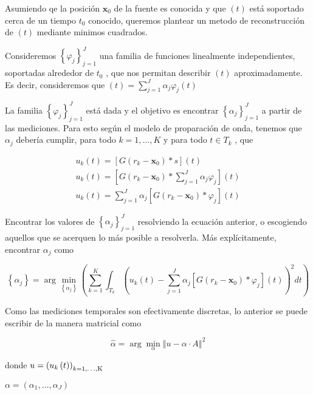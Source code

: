 Asumiendo qe la posición $\mathbf{x}_{0}$ de la fuente es conocida y que
$\left(t\right)$ está soportado cerca de un tiempo $t_{0}$ conocido, queremos
plantear un metodo de reconstrucción de $\left(t\right)$ mediante minimos cuadrados.

Consideremos $\left\{ \varphi_{j}\right\}_{j=1}^{J}$ una familia de funciones
linealmente independientes, soportadas alrededor de $t_{0}$ , que nos permitan
describir $\left(t\right)$ aproximadamente. Es decir, consideremos que
$\left(t\right)=\sum_{j=1}^{J}\alpha_{j}\varphi_{j}\left(t\right)$
 

La familia $\left\{ \varphi_{j}\right\}_{j=1}^{J}$
  está dada y el objetivo es encontrar $\left\{ \alpha_{j}\right\}_{j=1}^{J}$
  a partir de las mediciones. Para esto según el modelo de proparación de onda,
  tenemos que $\alpha_{j}$ debería cumplir, para todo $k=1,\ldots,K$
  y para todo $t\in T_{k}$
 , que

\begin{eqnarray}
u_{k}\left(t\right)	=	\left[G\left(r_{k}-\mathbf{x}_{0}\right)\ast
s\right]\left(t\right) \\
 u_{k}\left(t\right)=\left[G\left(r_{k}-\mathbf{x}_{0}\right)\ast\sum_{j=1}^{J}\alpha_{j}\varphi_{j}\right]\left(t\right)
 \\
 u_{k}\left(t\right)	=
 \sum_{j=1}^{J}\alpha_{j}\left[G\left(r_{k}-\mathbf{x}_{0}\right)\ast\varphi_{j}\right]\left(t\right)
\end{eqnarray}

 

Encontrar los valores de $\left\{ \alpha_{j}\right\} _{j=1}^{J}$
 resolviendo la ecuación anterior, o escogiendo aquellos que se acerquen lo más
posible a resolverla. Más explícitamente, encontrar $\alpha_{j}$ como

$$\left\{ \alpha_{j}\right\} =\arg\min_{\left\{ \alpha_{j}\right\}
}\left(\sum_{k=1}^{K}\int_{T_{k}}\left(u_{k}\left(t\right)-\sum_{j=1}^{J}\alpha_{j}\left[G\left(r_{k}-\mathbf{x}_{0}\right)\ast\varphi_{j}\right]\left(t\right)\right)^{2}dt\right)$$
 

Como las mediciones temporales son efectivamente discretas, lo anterior se puede escribir de la manera matricial como 

$$\hat{\alpha}=\arg\min_{\alpha}\left\Vert u-\alpha\cdot A\right\Vert ^{2}$$
 

donde $u=\left(u_{k}\left(t\right)\right)_{k=\text{1,\ensuremath{\ldots},K}}$
 

$\alpha=\left(\alpha_{1},\ldots,\alpha_{J}\right)$
 

